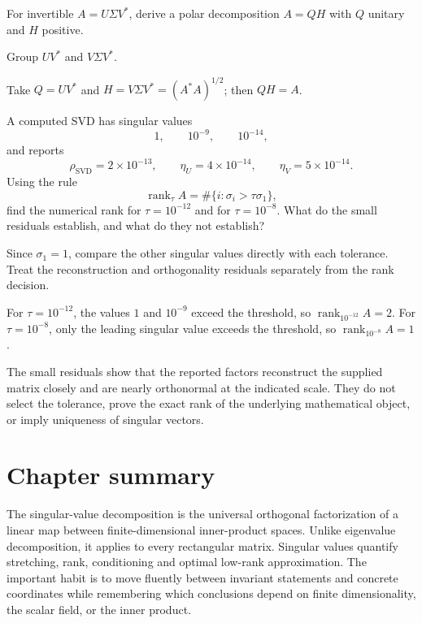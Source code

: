 \begin{exercise}\label{exr:i18-expand-16}
For invertible \(A=U\Sigma V^*\), derive a polar decomposition \(A=QH\) with \(Q\) unitary and \(H\) positive.
\end{exercise}
\begin{hint}
Group \(UV^*\) and \(V\Sigma V^*\).
\end{hint}
\begin{solution}
Take \(Q=UV^*\) and \(H=V\Sigma V^*=(A^*A)^{1/2}\); then \(QH=A\).
\end{solution}
\begin{exercise}\label{exr:i18-numerical-svd-01}
A computed SVD has singular values
\[
1,\qquad 10^{-9},\qquad 10^{-14},
\]
and reports
\[
\rho_{\mathrm{SVD}}=2\times10^{-13},
\qquad
\eta_U=4\times10^{-14},
\qquad
\eta_V=5\times10^{-14}.
\]
Using the rule
\[
\operatorname{rank}_{\tau}A
=
\#\{i:\sigma_i>\tau\sigma_1\},
\]
find the numerical rank for \(\tau=10^{-12}\) and for \(\tau=10^{-8}\).
What do the small residuals establish, and what do they not establish?
\end{exercise}
\begin{hint}
Since \(\sigma_1=1\), compare the other singular values directly with each
tolerance.  Treat the reconstruction and orthogonality residuals separately
from the rank decision.
\end{hint}
\begin{solution}
For \(\tau=10^{-12}\), the values \(1\) and \(10^{-9}\) exceed the threshold,
so \(\operatorname{rank}_{10^{-12}}A=2\).  For \(\tau=10^{-8}\), only the
leading singular value exceeds the threshold, so
\(\operatorname{rank}_{10^{-8}}A=1\).

The small residuals show that the reported factors reconstruct the supplied
matrix closely and are nearly orthonormal at the indicated scale.  They do not
select the tolerance, prove the exact rank of the underlying mathematical
object, or imply uniqueness of singular vectors.
\end{solution}
\section*{Chapter summary}
The singular-value decomposition is the universal orthogonal factorization of a linear map between finite-dimensional inner-product spaces. Unlike eigenvalue decomposition, it applies to every rectangular matrix. Singular values quantify stretching, rank, conditioning and optimal low-rank approximation.
The important habit is to move fluently between invariant statements and concrete coordinates while remembering which conclusions depend on finite dimensionality, the scalar field, or the inner product.

